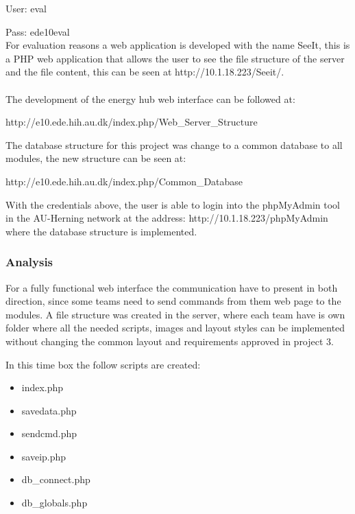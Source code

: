 User: eval

Pass: ede10eval\\

For evaluation reasons a web application is developed with the name SeeIt, this is a PHP web application that allows the user to see the file structure of the server and the file content, this can be seen at http://10.1.18.223/Seeit/.\\
\\The development of the energy hub web interface can be followed at:

http://e10.ede.hih.au.dk/index.php/Web\_Server\_Structure

The database structure for this project was change to a common database to all modules, the new structure can be seen at:

http://e10.ede.hih.au.dk/index.php/Common\_Database

With the credentials above, the user is able to login into the phpMyAdmin tool in the AU-Herning network at the address: http://10.1.18.223/phpMyAdmin where the database structure is implemented.\\

\subsubsection{Analysis}
%
%
For a fully functional web interface the communication have to present in both direction, since some teams need to send commands from them web page to the modules.
A file structure was created in the server, where each team have is own folder where all the needed scripts, images and layout styles can be implemented without changing the common layout and requirements approved in project 3.

In this time box the follow scripts are created:
\begin{itemize}
	\item index.php
	\item savedata.php
	\item sendcmd.php
	\item saveip.php
	\item db\_connect.php
	\item db\_globals.php
\end{itemize}

